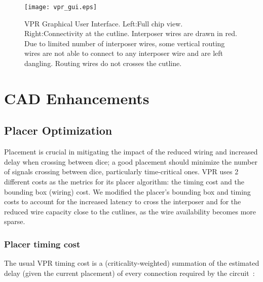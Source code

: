 \documentclass{sig-alternate-2013}
\begin{document}

\begin{figure}[!t]
\centering
\texttt{[image: vpr\_gui.eps]}
\caption{VPR Graphical User Interface. Left:Full chip view. Right:Connectivity at the cutline. Interposer wires are drawn in red. Due to limited number of interposer wires, some vertical routing wires are not able to connect to any interposer wire and are left dangling. Routing wires do not crosses the cutline.}
\label{fig:vpr_interposer_gui}
\end{figure}

\section{CAD Enhancements}
\label{cadSection}

\subsection{Placer Optimization}
\label{cad_enh_placer_subsection}
Placement is crucial in mitigating the impact of the reduced wiring and increased delay when crossing between dice; a good placement should minimize the number of signals crossing between dice, particularly time-critical ones. VPR uses 2 different costs as the metrics for its placer algorithm: the timing cost and the bounding box (wiring) cost. We modified the placer's bounding box and timing costs to account for the increased latency to cross the interposer and for the reduced wire capacity close to the cutlines, as the wire availability becomes more sparse.

\subsubsection{Placer timing cost}
The usual VPR timing cost is a (criticality-weighted) summation of the estimated delay (given the current placement) of every connection required by the circuit~\cite{timing2000}:
\end{document}
